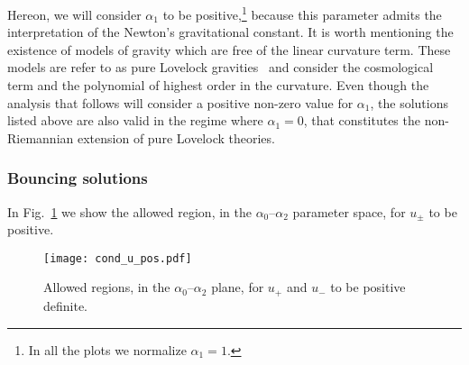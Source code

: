 \documentclass[aps,prd,12pt,superscriptaddress,showpacs,showkeys,reprint,nofootinbib]{revtex4-1}
\begin{document}
Hereon, we will consider $\alpha_1$ to be positive,\footnote{In all the plots we normalize $\alpha_1 = 1$.} because this parameter admits the interpretation of the Newton's gravitational constant. It is worth mentioning the existence of models of gravity which are free of the linear curvature term. These models are refer to as pure Lovelock gravities~\cite{Cai:2006pq} and consider the cosmological term and the polynomial of highest order in the curvature. Even though the analysis that follows will consider a positive non-zero value for $\alpha_1$, the solutions listed above are also valid in the regime where $\alpha_1=0$, that constitutes the non-Riemannian extension of pure Lovelock theories.

\subsubsection{Bouncing solutions}

In Fig.~\ref{cond_u_pos} we show the allowed region, in the $\alpha_0$--$\alpha_2$ parameter space, for $u_\pm$ to be positive. 

\begin{figure}[H]
  \texttt{[image: cond\_u\_pos.pdf]}
  \caption{Allowed regions, in the $\alpha_0$--$\alpha_2$ plane, for $u_+$ and $u_-$ to be positive definite.}
  \label{cond_u_pos}
\end{figure}
\end{document}
